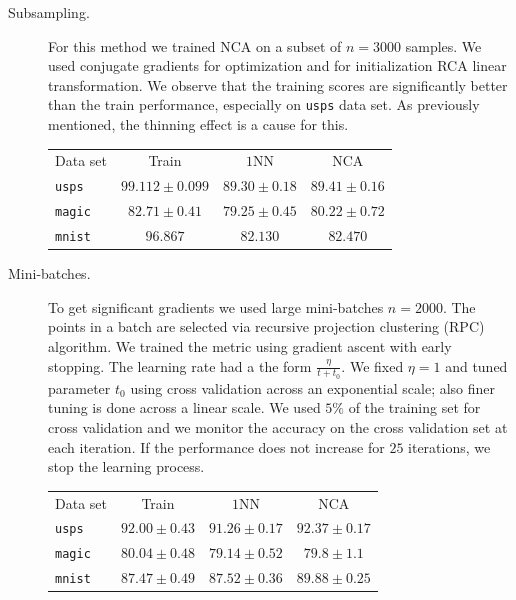 \begin{description}
  \item[Subsampling.] {
    For this method we trained NCA on a subset of $n=3000$ samples. We used conjugate gradients for optimization and for initialization RCA linear transformation. We observe that the training scores are significantly better than the train performance, especially on \texttt{usps} data set. As previously mentioned, the thinning effect is a cause for this.
    \begin{table}
    	\centering
    	\begin{tabular}{lccc}
    	\toprule
    	Data set & Train & $1$NN & NCA \\
    	\cmidrule(r){2-2}\cmidrule(r){3-3}\cmidrule(r){4-4} 
    	 \texttt{usps}&$99.112 \pm 0.099$&$89.30 \pm 0.18$&$89.41 \pm 0.16$\\
    	 \texttt{magic}&$82.71 \pm 0.41$&$79.25 \pm 0.45$&$80.22 \pm 0.72$\\
    	 \texttt{mnist}&$96.867$&$82.130$&$82.470$\\
    	 \bottomrule
    	\end{tabular}
    \end{table}
  }
  \item[Mini-batches.] {
    To get significant gradients we used large mini-batches $n=2000$. The points in a batch are selected via recursive projection clustering (RPC) algorithm. We trained the metric using gradient ascent with early stopping. The learning rate had a the form $\frac{\eta}{t+t_0}$. We fixed $\eta=1$ and tuned parameter $t_0$ using cross validation across an exponential scale; also finer tuning is done across a linear scale. We used $5\%$ of the training set for cross validation and we  monitor the accuracy on the cross validation set at each iteration. If the performance does not increase for $25$ iterations, we stop the learning process. 
    \begin{table}
        	\centering
        	\begin{tabular}{lccc}
        	\toprule
        	Data set & Train & $1$NN & NCA \\
        	\cmidrule(r){2-2}\cmidrule(r){3-3}\cmidrule(r){4-4} 
        	 \texttt{usps}&$92.00 \pm 0.43$&$91.26 \pm 0.17$&$92.37 \pm 0.17$\\
        	 \texttt{magic}&$80.04 \pm 0.48$&$79.14 \pm 0.52$&$79.8 \pm 1.1$\\
        	 \texttt{mnist}&$87.47 \pm 0.49$&$87.52 \pm 0.36$&$89.88 \pm 0.25$\\
        	 \bottomrule
        	\end{tabular}
    \end{table}
    
}
\end{description}
